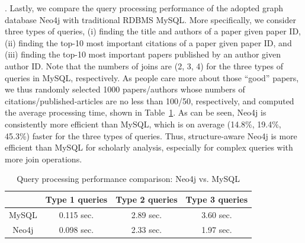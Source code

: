 .
Lastly, we compare the query processing performance of the adopted graph database Neo4j with traditional RDBMS MySQL. More specifically, we consider three types of queries, \ie (i) finding the title and authors of a paper given paper ID, (ii) finding the top-10 most important citations of a paper given paper ID, and (iii) finding the top-10 most important papers published by an author given author ID.
Note that the numbers of joins are (2, 3, 4) for the three types of queries in MySQL, respectively. As people care more about those ``good'' papers, we thus randomly selected 1000 papers/authors whose numbers of citations/published-articles are no less than 100/50, respectively, and computed the average processing time, shown in Table~\ref{tab-compare}.
As can be seen, Neo4j is consistently more efficient than MySQL, which is on average (14.8\%, 19.4\%, 45.3\%) faster for the three types of queries.
Thus, structure-aware Neo4j is more efficient than MySQL for scholarly analysis, especially for complex queries with more join operations.


\begin{table}[t!]
\begin{center}
\caption{Query processing performance comparison: Neo4j vs. MySQL}
\vspace{-1ex}
\label{tab-compare}
\begin{scriptsize}
\begin{tabular}{c c c c} %
\hline
{} & {Type 1 queries} & {Type 2 queries} & {Type 3 queries}\\
\hline
MySQL & 0.115 sec.  & 2.89 sec. & 3.60 sec. \\
Neo4j & 0.098 sec.  & 2.33 sec. & 1.97 sec. \\
\hline
\end{tabular}
\end{scriptsize}
\vspace{-3ex}
\end{center}
\end{table}



